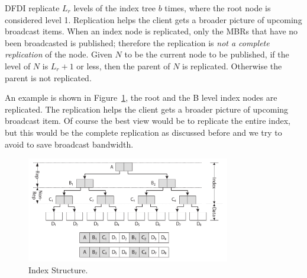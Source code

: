 \documentclass{sig-alternate}
\begin{document}
DFDI replicate $L_r$ levels of the index tree $b$ times, where the
root node is considered level 1. Replication
helps the client gets a broader picture of upcoming broadcast items.
When an index node is replicated, only the MBRs that have no been broadcasted
is published; therefore the replication is \emph{not a complete replication}
of the node. Given $N$ to be the current node to be published, if the level
of $N$ is $L_r + 1$ or less, then the parent of $N$ is replicated. Otherwise
the parent is not replicated.

An example is shown in Figure~\ref{fig:index_struct},
the root and the B level index nodes are replicated. The replication
helps the client gets a broader picture of upcoming broadcast item. Of
course the best view would be to replicate the entire index, but this
would be the complete replication as discussed before and we try to
avoid to save broadcast bandwidth.
%

\begin{figure}[h]
\begin{center}
\includegraphics[width=3.5in]{Figures/bcast_struct.pdf}
\caption{\small Index Structure.
\label{fig:index_struct}}
\end{center}
\end{figure}
\end{document}
